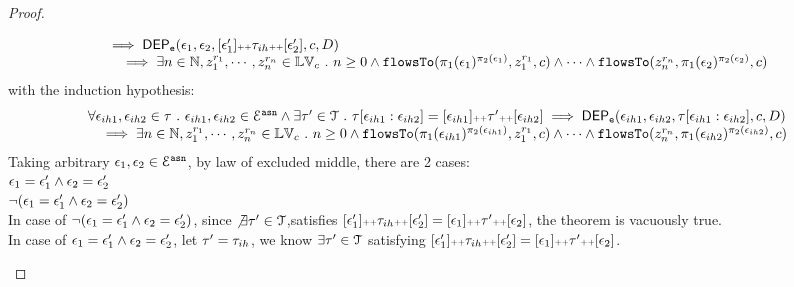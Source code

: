 \begin{proof}
\begin{case}
\[\begin{array}{l}
          \implies
          \mathsf{DEP_{\mathtt{e}}}(\mathtt{\epsilon}_1, \mathtt{\epsilon}_2, [\mathtt{\epsilon}_1'] {\scriptscriptstyle ++} \mathtt{\tau}_{ih} {\scriptscriptstyle ++} [\mathtt{\epsilon}_2'], c, D) 
          \\ \quad 
          \implies 
          \exists n \in \mathbb{N}, z_1^{r_1}, \cdots, z_n^{r_n} \in \mathbb{LV}_{{c}} ~.~ n \geq 0 \land
          \mathtt{flowsTo}(\pi_1(\mathtt{\epsilon}_1)^{\pi_2(\mathtt{\epsilon}_1)},  z_1^{r_1}, c) 
          \land \cdots \land \mathtt{flowsTo}(z_n^{r_n}, \pi_1(\mathtt{\epsilon}_2)^{\pi_2(\mathtt{\epsilon}_2)}, c) 
        \end{array}
        \]
        with the induction hypothesis:
        \[
          \begin{array}{l}
            \forall \mathtt{\epsilon}_{ih1}, \mathtt{\epsilon}_{ih2} \in \mathtt{\tau} ~.~ \mathtt{\epsilon}_{ih1}, \mathtt{\epsilon}_{ih2} \in \mathcal{E}^{\mathtt{{asn}}} 
            \land
             \exists \mathtt{\tau}' \in \mathcal{T} ~.~ 
             \mathtt{\tau}[\mathtt{\epsilon}_{ih1}:\mathtt{\epsilon}_{ih2}] = [\mathtt{\epsilon}_{ih1}] {\scriptscriptstyle ++} \mathtt{\tau}' {\scriptscriptstyle ++} [\mathtt{\epsilon}_{ih2}]
            \implies
            \mathsf{DEP_{\mathtt{e}}}(\mathtt{\epsilon}_{ih1}, \mathtt{\epsilon}_{ih2}, \mathtt{\tau}[\mathtt{\epsilon}_{ih1}:\mathtt{\epsilon}_{ih2}], c, D) 
            \\ \quad 
            \implies 
            \exists n \in \mathbb{N}, z_1^{r_1}, \cdots, z_n^{r_n} \in \mathbb{LV}_{{c}} ~.~ n \geq 0 \land
            \mathtt{flowsTo}(\pi_1(\mathtt{\epsilon}_{ih1})^{\pi_2(\mathtt{\epsilon}_{ih1})},  z_1^{r_1}, c) 
            \land \cdots \land \mathtt{flowsTo}(z_n^{r_n}, \pi_1(\mathtt{\epsilon}_{ih2})^{\pi_2(\mathtt{\epsilon}_{ih2})}, c) 
          \end{array}
        \]
        Taking arbitrary $ \mathtt{\epsilon}_1, \mathtt{\epsilon}_2 \in \mathcal{E}^{\mathtt{{asn}}}$, by law of excluded middle, there are 2 cases:
        \\
        $\mathtt{\epsilon}_1 = \mathtt{\epsilon}_1' \land  \mathtt{\epsilon}_2 = \mathtt{\epsilon}_2'$
        \\
        $\neg(\mathtt{\epsilon}_1 = \mathtt{\epsilon}_1' \land  \mathtt{\epsilon}_2 = \mathtt{\epsilon}_2')$
        \\
        In case of $\neg(\mathtt{\epsilon}_1 = \mathtt{\epsilon}_1' \land  \mathtt{\epsilon}_2 = \mathtt{\epsilon}_2')$, since 
        $\not\exists \mathtt{\tau}' \in \mathcal{T}$,satisfies $
        [\mathtt{\epsilon}_1'] {\scriptscriptstyle ++} \mathtt{\tau}_{ih} {\scriptscriptstyle ++} [\mathtt{\epsilon}_2']  = [\mathtt{\epsilon}_1] {\scriptscriptstyle ++} \mathtt{\tau}' {\scriptscriptstyle ++} [\mathtt{\epsilon}_2]$, 
        the theorem is vacuously true.
        \\
        In case of $\mathtt{\epsilon}_1 = \mathtt{\epsilon}_1' \land  \mathtt{\epsilon}_2 = \mathtt{\epsilon}_2'$,
        let $\mathtt{\tau}' = \mathtt{\tau}_{ih}$, we know $\exists \mathtt{\tau}' \in \mathcal{T}$ satisfying 
        $[\mathtt{\epsilon}_1'] {\scriptscriptstyle ++} \mathtt{\tau}_{ih} {\scriptscriptstyle ++} [\mathtt{\epsilon}_2'] = [\mathtt{\epsilon}_1] {\scriptscriptstyle ++} \mathtt{\tau}' {\scriptscriptstyle ++} [\mathtt{\epsilon}_2]$.
        \\

\end{case}
\end{proof}
